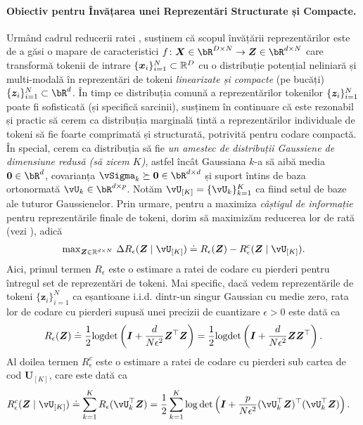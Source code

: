 \documentclass[../../book-main_ro.tex]{subfiles}
\begin{document}
\paragraph{Obiectiv pentru Învățarea unei Reprezentări Structurate și Compacte.}
Urmând cadrul reducerii ratei , susținem că scopul învățării reprezentărilor este de a găsi o mapare de caracteristici \(f
\colon \X \in \bR^{D \times N} \to \Z\in \bR^{d \times N}\) care transformă tokenii de intrare \(\{\bm x_i\}_{i=1}^N \subset \mathbb{R}^D\) cu o distribuție potențial neliniară și multi-modală în reprezentări de tokeni \textit{linearizate și compacte} (pe bucăți) \(\{\bm z_i\}_{i=1}^N \subset \bR^{d}\). În timp ce distribuția comună a reprezentărilor tokenilor \(\{\bm{z}_{i}\}_{i = 1}^{N}\) poate fi sofisticată (și specifică sarcinii), susținem în continuare că este rezonabil și practic să cerem ca distribuția marginală țintă a reprezentărilor individuale de tokeni să fie foarte comprimată și structurată, potrivită pentru codare compactă. În special, cerem ca distribuția să fie \textit{un amestec de distribuții Gaussiene de dimensiune redusă (să zicem \(K\))}, astfel încât Gaussiana \(k\)-a să aibă media \(\Zero \in \bR^{d}\), covarianța \(\vSigma_{k} \succeq \Zero \in \bR^{d \times d}\) și suport întins de baza ortonormată \(\vU_{k} \in \bR^{d \times p}\). 
Notăm $\vU_{[K]} = \{\vU_k\}_{k=1}^K$ ca fiind setul de baze ale tuturor Gaussienelor. Prin urmare, pentru a maximiza \textit{câștigul de informație} \cite{ma2022principles} pentru reprezentările finale de tokeni, dorim să maximizăm reducerea lor de rată (vezi ), adică 
\begin{align}\label{eq:rate reduction}
    \mathrm{max}_{\bm Z \in \R^{d\times N}}\ \Delta R_{\epsilon}(\Z \mid \vU_{[K]}) \doteq R_{\epsilon}(\Z) - R^c_{\epsilon}(\Z \mid \vU_{[K]}).
\end{align}
Aici, primul termen $R_{\epsilon}$ este o estimare a ratei de codare cu pierderi pentru întregul set de reprezentări de tokeni. Mai specific, dacă vedem reprezentările de tokeni $\{\bm z_i\}_{i=1}^N$ ca eșantioane i.i.d. dintr-un singur Gaussian cu medie zero, rata lor de codare cu pierderi supusă unei precizii de cuantizare $\epsilon > 0$ este dată ca
\begin{equation}\label{eq:coding_rate}
    R_{\epsilon}(\bm{Z}) \doteq \frac{1}{2}\textrm{logdet}\left(\bm{I} + \frac{d}{N\epsilon^{2}}\bm{Z}^{\top}\bm{Z}\right) = \frac{1}{2}\textrm{logdet}\left(\bm{I} + \frac{d}{N\epsilon^{2}}\bm{Z}\bm{Z}^{\top}\right).
\end{equation}
Al doilea termen $R_{\epsilon}^c$ este o estimare a ratei de codare cu pierderi sub cartea de cod $\bm U_{[K]}$, care este dată ca 
\begin{equation}
\begin{aligned}
    R_{\epsilon}^c(\Z \mid \vU_{[K]}) &\doteq \sum_{k=1}^{K}R_{\epsilon}(\vU_k^{\top} \Z) = \frac{1}{2}\sum_{k=1}^{K}\log\det\left(\I +
    \frac{p}{N\epsilon^{2}}(\vU_k^{\top}\Z)^{\top}(\vU_k^{\top}\Z)\right).
\end{aligned}
\label{eq:def-mcr-Rc}
\end{equation}
\end{document}
